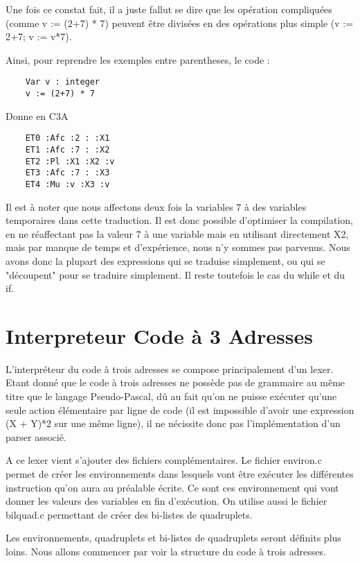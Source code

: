\documentclass{article}
\begin{document}
\bigbreak

Une fois ce constat fait, il a juste fallut se dire que les opération compliquées (comme v := (2+7) * 7) peuvent être divisées en des opérations plus simple (v := 2+7; v := v*7).

Ainsi, pour reprendre les exemples entre parentheses, le code :

\begin{lstlisting}
    Var v : integer
    v := (2+7) * 7
\end{lstlisting}

Donne en C3A

\begin{lstlisting}
    ET0 :Afc :2 : :X1
    ET1 :Afc :7 : :X2
    ET2 :Pl :X1 :X2 :v
    ET3 :Afc :7 : :X3
    ET4 :Mu :v :X3 :v
\end{lstlisting}

Il est à noter que nous affectons deux fois la variables 7 à des variables temporaires dans cette traduction. Il est donc possible d'optimiser la compilation, en ne réaffectant pas la valeur 7 à une variable mais en utilisant directement X2, mais par manque de temps et d'expérience, nous n'y sommes pas parvenus.
\bigbreak
Nous avons donc la plupart des expressions qui se traduise simplement, ou qui se "découpent" pour se traduire simplement. Il reste toutefois le cas du while et du if.

\newpage
\section{Interpreteur Code à 3 Adresses}

L'interpréteur du code à trois adresses se compose principalement d'un lexer. Etant donné que le code à trois adresses ne possède pas de grammaire au même titre que le langage Pseudo-Pascal,
dû au fait qu'on ne puisse exécuter qu'une seule action élémentaire par ligne de code (il est impossible d'avoir une expression (X + Y)*2 sur une même ligne), il ne nécissite donc pas l'implémentation d'un parser associé.

A ce lexer vient s'ajouter des fichiers complémentaires. Le fichier environ.c permet de créer les environnements dans lesquels vont être exécuter les différentes instruction qu'on aura au préalable écrite. Ce sont ces environnement qui vont donner les valeurs des variables en fin d'exécution.
On utilise aussi le fichier bilquad.c permettant de créer des bi-listes de quadruplets.

Les environnements, quadruplets et bi-listes de quadruplets seront définits plus loins. Nous allons commencer par voir la structure du code à trois adresses.
\end{document}
